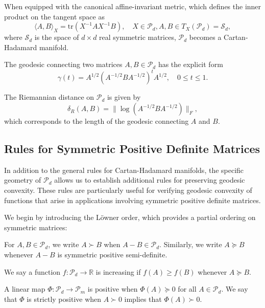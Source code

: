 When equipped with the canonical affine-invariant metric, which defines the inner product on the tangent space as
\begin{equation}
\langle A, B \rangle_X = \text{tr}(X^{-1} A X^{-1} B), \quad X \in \mathcal{P}_d, A, B \in T_X(\mathcal{P}_d) = \mathcal{S}_d,
\end{equation}
where $\mathcal{S}_d$ is the space of $d \times d$ real symmetric matrices, $\mathcal{P}_d$ becomes a Cartan-Hadamard manifold.

The geodesic connecting two matrices $A, B \in \mathcal{P}_d$ has the explicit form
\begin{equation}
\gamma(t) = A^{1/2} (A^{-1/2} B A^{-1/2})^t A^{1/2}, \quad 0 \leq t \leq 1.
\end{equation}

The Riemannian distance on $\mathcal{P}_d$ is given by
\begin{equation}
\delta_R(A, B) = \|{\log(A^{-1/2} B A^{-1/2})}\|_F,
\end{equation}
which corresponds to the length of the geodesic connecting $A$ and $B$.

\subsection{Rules for Symmetric Positive Definite Matrices}

In addition to the general rules for Cartan-Hadamard manifolds, the specific geometry of $\mathcal{P}_d$ allows us to establish additional rules for preserving geodesic convexity. These rules are particularly useful for verifying geodesic convexity of functions that arise in applications involving symmetric positive definite matrices.

We begin by introducing the Löwner order, which provides a partial ordering on symmetric matrices:

\begin{definition}
For $A, B \in \mathcal{P}_d$, we write $A \succ B$ when $A - B \in \mathcal{P}_d$. Similarly, we write $A \succeq B$ whenever $A - B$ is symmetric positive semi-definite.
\end{definition}

We say a function $f: \mathcal{P}_d \rightarrow \mathbb{R}$ is increasing if $f(A) \geq f(B)$ whenever $A \succeq B$.

\begin{definition}
A linear map $\Phi: \mathcal{P}_d \rightarrow \mathcal{P}_m$ is positive when $\Phi(A) \succeq 0$ for all $A \in \mathcal{P}_d$. We say that $\Phi$ is strictly positive when $A \succ 0$ implies that $\Phi(A) \succ 0$.
\end{definition}


